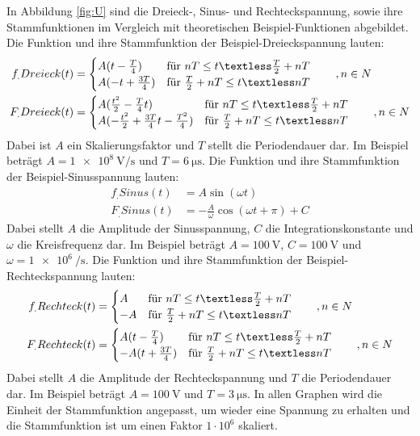 In Abbildung \ref{fig:U} sind die Dreieck-, Sinus- und Rechteckspannung, sowie ihre Stammfunktionen im Vergleich mit theoretischen Beispiel-Funktionen abgebildet.
Die Funktion und ihre Stammfunktion der Beispiel-Dreieckspannung lauten:
\begin{align*}
f_.{Dreieck}(t)	&= 
	\begin{cases}
    A(t-\frac{T}{4})	& \text{für } nT \le t \textless \frac{T}{2}+nT\\
    A(-t+\frac{3T}{4})	& \text{für } \frac{T}{2}+nT \le t \textless nT
   	\end{cases}
\hspace{2em},n\in N \\
F_.{Dreieck}(t)	&= 
	\begin{cases}
    A(\frac{t^2}{2}-\frac{T}{4}t)					& \text{für } nT \le t \textless \frac{T}{2}+nT\\
    A(-\frac{t^2}{2}+\frac{3T}{4}t-\frac{T^2}{4})	& \text{für } \frac{T}{2}+nT \le t \textless nT
   	\end{cases}
\hspace{2em},n\in N \\
\end{align*} 
Dabei ist $A$ ein Skalierungsfaktor und $T$ stellt die Periodendauer dar. Im Beispiel beträgt $A=\SI{1e8}{\volt\per\second}$ und $T=\SI{6}{\micro\second}$. 
Die Funktion und ihre Stammfunktion der Beispiel-Sinusspannung lauten:
\begin{align*}
f_.{Sinus}(t)	&= A\sin(\omega t) \\
F_.{Sinus}(t)	&= -\frac{A}{\omega}\cos(\omega t +\pi)+C
\end{align*} 
Dabei stellt $A$ die Amplitude der Sinusspannung, $C$ die Integrationskonstante und $\omega$ die Kreisfrequenz dar. Im Beispiel beträgt $A=\SI{100}{\volt}$, $C=\SI{100}{\volt}$ und $\omega=\SI{1e6}{\per\second}$.
Die Funktion und ihre Stammfunktion der Beispiel-Rechteckspannung lauten:
\begin{align*}
f_.{Rechteck}(t)&=
	\begin{cases}
     A	& \text{für } nT \le t \textless \frac{T}{2}+nT\\
     -A  & \text{für } \frac{T}{2}+nT \le t \textless nT
   	\end{cases}
\hspace{2em},n\in N \\
F_.{Rechteck}(t)&=
	\begin{cases}
    A(t-\frac{T}{4}) 	& \text{für } nT \le t \textless \frac{T}{2}+nT\\
    -A(t+\frac{3T}{4})	& \text{für } \frac{T}{2}+nT \le t \textless nT
   	\end{cases}
\hspace{2em},n\in N \\
\end{align*} 
Dabei stellt $A$ die Amplitude der Rechteckspannung und $T$ die Periodendauer dar. Im Beispiel beträgt $A=\SI{100}{\volt}$ und $T=\SI{3}{\micro\second}$.
In allen Graphen wird die Einheit der Stammfunktion angepasst, um wieder eine Spannung zu erhalten und die Stammfunktion ist um einen Faktor $1\cdot 10^{6}$ skaliert.  